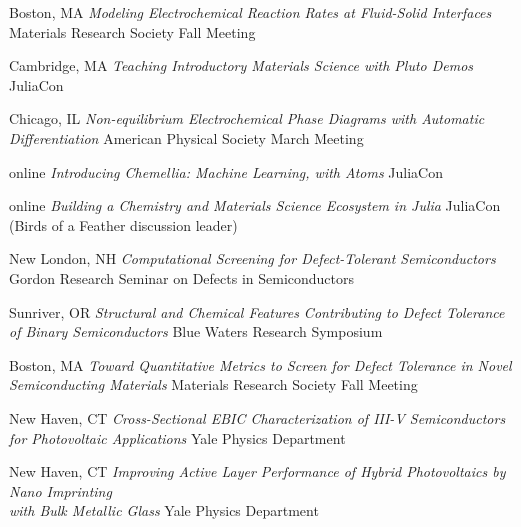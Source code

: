 {Boston, MA}
{\textit{Modeling Electrochemical Reaction Rates at Fluid-Solid Interfaces}}
{Materials Research Society Fall Meeting}

\vspace{\talksep}
\datedsubsection{}
        {Cambridge, MA}
        {\textit{Teaching Introductory Materials Science with Pluto Demos}}
        {JuliaCon}

\vspace{\talkyearsep}
	{Chicago, IL}
	{\textit{Non-equilibrium Electrochemical Phase Diagrams with Automatic Differentiation}}
    {American Physical Society March Meeting}

\vspace{\talkyearsep}
	{online}
	{\textit{Introducing Chemellia: Machine Learning, with Atoms}}
    {JuliaCon}

\vspace{\talksep}
\datedsubsection{}
	{online}
	{\textit{Building a Chemistry and Materials Science Ecosystem in Julia}}
    {JuliaCon (Birds of a Feather discussion leader)}

\vspace{\talkyearsep}
	{New London, NH}
	{\textit{Computational Screening for Defect-Tolerant Semiconductors}}
    {Gordon Research Seminar on Defects in Semiconductors}

\vspace{\talksep}
\datedsubsection{}
	{Sunriver, OR}
	{\textit{Structural and Chemical Features Contributing to Defect Tolerance of Binary Semiconductors}}
    {Blue Waters Research Symposium}

\vspace{\talkyearsep}
    {Boston, MA}
    {\textit{Toward Quantitative Metrics to Screen for Defect Tolerance in Novel Semiconducting Materials}}
    {Materials Research Society Fall Meeting}

\vspace{\talksep}
    {New Haven, CT}
    {\textit{Cross-Sectional EBIC Characterization of III-V Semiconductors for Photovoltaic Applications}}
    {Yale Physics Department}

\vspace{\talksep}
    {New Haven, CT}
    {\textit{Improving Active Layer Performance of Hybrid Photovoltaics by Nano Imprinting\\ with Bulk Metallic Glass}}
    {Yale Physics Department}
